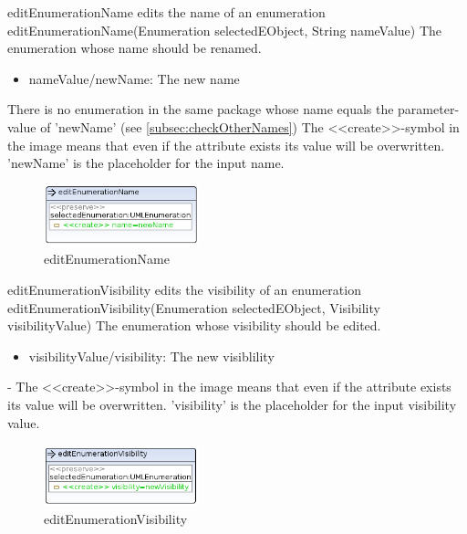 \op
{editEnumerationName}
{edits the name of an enumeration}
{editEnumerationName(Enumeration selectedEObject, String nameValue)}
{The enumeration whose name should be renamed.}
{
\begin{itemize}
 \item nameValue/newName: The new name
\end{itemize}
}
{There is no enumeration in the same package whose name equals the parameter-value of
'newName' (see
\ref{subsec:checkOtherNames})}
{The \textless\textless create\textgreater\textgreater  -symbol in the image
means that even if the attribute exists its value will be overwritten.
'newName' is the placeholder for the input name.}
\begin{figure}[H]
  \centering
  \includegraphics[width=0.4\textwidth]{pics/editEnumerationName.png}
  \caption{editEnumerationName}
  \label{editEnumerationName}
\end{figure}
\op
{editEnumerationVisibility}
{edits the visibility of an enumeration}
{editEnumerationVisibility(Enumeration selectedEObject, Visibility visibilityValue)}
{The enumeration whose visibility should be edited.}
{
\begin{itemize}
 \item visibilityValue/visibility: The new visiblility
\end{itemize}
}
{-}
{The \textless\textless create\textgreater\textgreater  -symbol in the image
means that even if the attribute exists its value will be overwritten.
'visibility' is the placeholder for the input visibility value.}
\begin{figure}[H]
  \centering
  \includegraphics[width=0.4\textwidth]{pics/editEnumerationVisibility.png}
  \caption{editEnumerationVisibility}
  \label{editEnumerationVisibility}
\end{figure}
